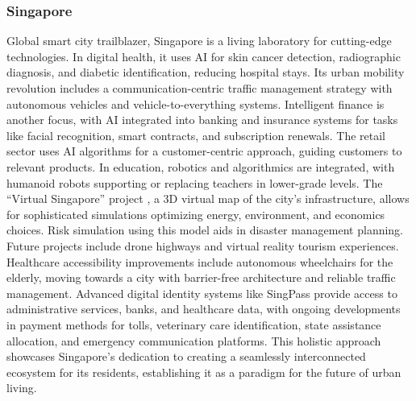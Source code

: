 \subsubsection{Singapore}
Global smart city trailblazer, Singapore is a living laboratory for cutting-edge technologies. In digital health, it uses AI for skin cancer detection, radiographic diagnosis, and diabetic identification, reducing hospital stays. Its urban mobility revolution includes a communication-centric traffic management strategy with autonomous vehicles and vehicle-to-everything systems.
Intelligent finance is another focus, with AI integrated into banking and insurance systems for tasks like facial recognition, smart contracts, and subscription renewals. The retail sector uses AI algorithms for a customer-centric approach, guiding customers to relevant products. In education, robotics and algorithmics are integrated, with humanoid robots supporting or replacing teachers in lower-grade levels.
The ``Virtual Singapore'' project \cite{VirtualSingapore}, a 3D virtual map of the city's infrastructure, allows for sophisticated simulations optimizing energy, environment, and economics choices. Risk simulation using this model aids in disaster management planning. Future projects include drone highways and virtual reality tourism experiences.
Healthcare accessibility improvements include autonomous wheelchairs for the elderly, moving towards a city with barrier-free architecture and reliable traffic management. Advanced digital identity systems like SingPass provide access to administrative services, banks, and healthcare data, with ongoing developments in payment methods for tolls, veterinary care identification, state assistance allocation, and emergency communication platforms. This holistic approach showcases Singapore's dedication to creating a seamlessly interconnected ecosystem for its residents, establishing it as a paradigm for the future of urban living.

